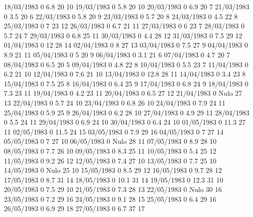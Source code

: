 18/03/1983  0      6.8    20     10 
19/03/1983  0      5.8    20     10 
20/03/1983  0      6.9    20     7 
21/03/1983  0      3.5    20     6 
22/03/1983  0      5.8    20     9 
23/03/1983  0      5.7    20     8 
24/03/1983  0      4.5    22     8 
25/03/1983  0      7      23     12 
26/03/1983  0      6.7    21     11 
27/03/1983  0      6      23     7 
28/03/1983  0      5.7    24     7 
29/03/1983  0      6.8    25     11 
30/03/1983  0      4.4    28     12 
31/03/1983  0      7.5    29     12 
01/04/1983  0      12     28     14 
02/04/1983  0      8      27     13 
03/04/1983  0      7.5    27     9 
04/04/1983  0      8.9    21     11 
05/04/1983  0      5      20     9 
06/04/1983  0      3.1    21     6 
07/04/1983  0      4.7    20     7 
08/04/1983  0      6.5    20     5 
09/04/1983  0      4.8    22     8 
10/04/1983  0      5.5    23     7 
11/04/1983  0      6.2    21     10 
12/04/1983  0      7.6    21     10 
13/04/1983  0      12.8   28     11 
14/04/1983  0      3.4    23     8 
15/04/1983  0      7.5    25     8 
16/04/1983  0      6.4    25     9 
17/04/1983  0      6.8    24     9 
18/04/1983  0      7.3    23     11 
19/04/1983  0      4.2    23     11 
20/04/1983  0      6.5    27     12 
21/04/1983  0     Nulo    27     13 
22/04/1983  0      5.7    24     10 
23/04/1983  0      6.8    26     10 
24/04/1983  0      7.9    24     11 
25/04/1983  0      5.9    25     9 
26/04/1983  0      6.2    28     10 
27/04/1983  0      4.9    29     11 
28/04/1983  0      5.5    24     11 
29/04/1983  0      6.9    24     10 
30/04/1983  0      6.4    24     10 
01/05/1983  0      11.3   27     11 
02/05/1983  0      11.5   24     15 
03/05/1983  0      7.9    29     16 
04/05/1983  0      7      27     14 
05/05/1983  0      7      27     10 
06/05/1983  0     Nulo    28     11 
07/05/1983  0      8.9    28     10 
08/05/1983  0      7.7    26     10 
09/05/1983  0      8.3    25     11 
10/05/1983  0      5.4    25     12 
11/05/1983  0      9.2    26     12 
12/05/1983  0      7.4    27     10 
13/05/1983  0      7.7    25     10 
14/05/1983  0     Nulo    25     10 
15/05/1983  0      8.5    29     12 
16/05/1983  0      9.7    28     12 
17/05/1983  0      8.7    31     14 
18/05/1983  0      10.1   31     14 
19/05/1983  0      12.3   31     10 
20/05/1983  0      7.5    29     10 
21/05/1983  0      7.3    28     13 
22/05/1983  0     Nulo    30     16 
23/05/1983  0      7.2    29     16 
24/05/1983  0      9.1    28     15 
25/05/1983  0      6.4    29     16 
26/05/1983  0      6.9    29     18 
27/05/1983  0      6.7    37     17 
